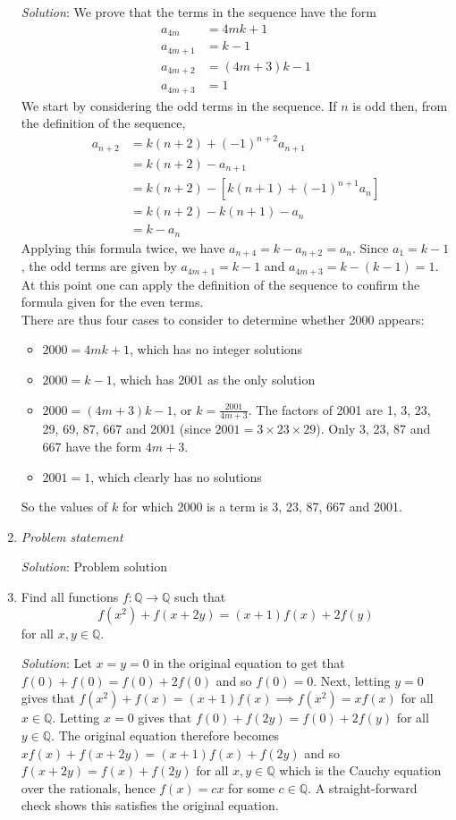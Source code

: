 \documentclass{article}
\begin{document}
\begin{enumerate}[1.]
\textit{Solution}:
We prove that the terms in the sequence have the form
\begin{align*}
a_{4m} &= 4mk + 1 \\
a_{4m+1} &= k-1 \\
a_{4m+2} &= (4m + 3)k - 1 \\
a_{4m+3} &= 1
\end{align*}
We start by considering the odd terms in the sequence. If $n$ is odd then, from the definition of the sequence, 
\begin{align*}
a_{n+2} &= k(n + 2) + (-1)^{n+2}a_{n+1}\\
&= k(n + 2) - a_{n+1}\\
&= k(n + 2) - [k(n + 1) + (-1)^{n+1}a_{n}]\\
&= k(n + 2) - k(n + 1) - a_{n}\\
&= k - a_{n}
\end{align*}
Applying this formula twice, we have $a_{n+4} = k - a_{n+2} = a_{n}$. Since $a_{1} = k - 1$, the odd terms are given by $a_{4m+1} = k - 1$ and $a_{4m+3} = k - (k - 1) = 1$. 
At this point one can apply the definition of the sequence to confirm the formula given for the even terms.\\
There are thus four cases to consider to determine whether 2000 appears:
\begin{itemize}
	\item $2000 = 4mk + 1$, which has no integer solutions
	\item $2000 = k - 1$, which has 2001 as the only solution
	\item $2000 = (4m + 3)k - 1$, or $k = \frac{2001}{4m+3}$. The factors of 2001 are 1, 3, 23, 29, 69, 87, 667 and 2001 (since $2001 = 3 \times 23 \times 29$). Only 3, 23, 87 and 667 have the form $4m + 3$.
	\item $ 2001 = 1$, which clearly has no solutions
\end{itemize}
So the values of $k$ for which 2000 is a term is 3, 23, 87, 667 and 2001.

\item %
\textit{Problem statement}

\textit{Solution}: Problem solution

\item %
\newcommand{\QQ}{\mathbb{Q}}
Find all functions $f : \QQ \to \QQ$ such that
\[ f(x^2) +f(x+2y) = (x+1)f(x) +2f(y) \]
for all $x, y \in \QQ$. 

\textit{Solution}: 
Let $x=y=0$ in the original equation to get that $f(0)+f(0)=f(0)+2f(0)$ and so $f(0)=0$. Next, letting $y=0$ gives that $f(x^2)+f(x)=(x+1)f(x) \implies f(x^2)=xf(x)$ for all $x \in \QQ$. Letting $x=0$ gives that $f(0)+f(2y)=f(0)+2f(y)$ for all $y \in \QQ$. The original equation therefore becomes $xf(x)+f(x+2y)=(x+1)f(x)+f(2y)$ and so $f(x+2y)=f(x)+f(2y)$ for all $x,y \in \QQ$ which is the Cauchy equation over the rationals, hence $f(x)=cx$ for some $c\in\QQ$. A straight-forward check shows this satisfies the original equation.



\end{enumerate}
\end{document}
